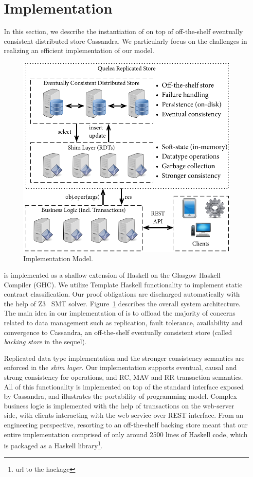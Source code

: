 \section{Implementation}

In this section, we describe the instantiation of \name on top of off-the-shelf
eventually consistent distributed store Cassandra. We particularly focus on the
challenges in realizing an efficient implementation of our model.

\begin{figure}
\begin{center}
\includegraphics[width=0.9\columnwidth]{Figures/ImplModel}
\end{center}
\caption{Implementation Model.}
\label{fig:impl_mod}
\end{figure}

\name is implemented as a shallow extension of Haskell on the Glasgow Haskell
Compiler (GHC). We utilize Template Haskell functionality to implement static
contract classification. Our proof obligations are discharged automatically
with the help of Z3~\cite{} SMT solver. Figure~\ref{fig:impl_mod} describes the
overall system architecture. The main idea in our implementation of \name is to
offload the majority of concerns related to data management such as
replication, fault tolerance, availability and convergence to Cassandra, an
off-the-shelf eventually consistent store (called \emph{backing store} in the
sequel).

Replicated data type implementation and the stronger consistency semantics are
enforced in the \emph{shim layer}. Our implementation supports eventual, causal
and strong consistency for operations, and RC, MAV and RR transaction
semantics. All of this functionality is implemented on top of the standard
interface exposed by Cassandra, and illustrates the portability of \name
programming model. Complex business logic is implemented with the help of
transactions on the web-server side, with clients interacting with the
web-service over REST interface. From an engineering perspective, resorting to
an off-the-shelf backing store meant that our entire implementation comprised of
only around 2500 lines of Haskell code, which is packaged as a Haskell
library\footnote{url to the hackage}.

